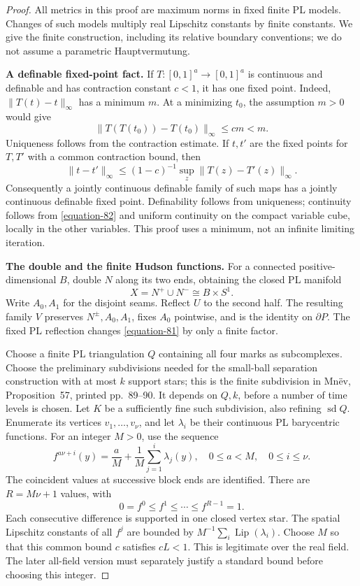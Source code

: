 \documentclass[11pt,a4paper]{article}
\theoremstyle{definition}
\begin{document}
\begin{proof}
All metrics in this proof are maximum norms in fixed finite PL models.
Changes of such models multiply real Lipschitz constants by finite
constants. We give the finite construction, including its relative
boundary conventions; we do not assume a parametric Hauptvermutung.

\textbf{A definable fixed-point fact.}\quad
If \(T:[0,1]^a\to[0,1]^a\) is continuous and definable and has
contraction constant \(c<1\), it has one fixed point. Indeed,
\(\|T(t)-t\|_\infty\) has a minimum \(m\). At a minimizing \(t_0\),
the assumption \(m>0\) would give
\[
 \|T(T(t_0))-T(t_0)\|_\infty\leq cm<m.
\]
Uniqueness follows from the contraction estimate. If \(t,t'\) are
the fixed points for \(T,T'\) with a common contraction bound, then
\begin{equation}
 \|t-t'\|_\infty\leq
 (1-c)^{-1}\sup_z\|T(z)-T'(z)\|_\infty.
 \label{equation-82}
\end{equation}
Consequently a jointly continuous definable family of such maps has
a jointly continuous definable fixed point. Definability follows from
uniqueness; continuity follows from \eqref{equation-82} and uniform continuity on
the compact variable cube, locally in the other variables. This proof
uses a minimum, not an infinite limiting iteration.

\textbf{The double and the finite Hudson functions.}\quad
For a connected positive-dimensional \(B\), double \(N\) along its two
ends, obtaining the closed PL manifold
\[
 X=N^+\cup N^-\cong B\times S^1.
\]
Write \(A_0,A_1\) for the disjoint seams. Reflect \(U\) to the second
half. The resulting family \(V\) preserves \(N^\pm,A_0,A_1\), fixes
\(A_0\) pointwise, and is the identity on \(\partial P\).
The fixed PL reflection changes \eqref{equation-81} by only a finite factor.

Choose a finite PL triangulation \(Q\) containing all four marks as
subcomplexes. Choose the preliminary subdivisions needed for the
small-ball separation construction with at most \(k\) support stars;
this is the finite subdivision in Mn\"ev, Proposition~57,
printed pp.~89--90. It depends on \(Q,k\), before a number of time
levels is chosen. Let \(K\) be a sufficiently fine such subdivision,
also refining \(\operatorname{sd}Q\).
Enumerate its vertices \(v_1,\ldots,v_\nu\), and let \(\lambda_i\)
be their continuous PL barycentric functions.
For an integer \(M>0\), use the sequence
\begin{equation}
 f^{a\nu+i}(y)=\frac aM+
        \frac1M\sum_{j=1}^{i}\lambda_j(y),
 \quad 0\leq a<M,\quad0\leq i\leq\nu .
 \label{equation-83}
\end{equation}
The coincident values at successive block ends are identified.
There are \(R=M\nu+1\) values, with
\[
 0=f^0\leq f^1\leq\cdots\leq f^{R-1}=1.
\]
Each consecutive difference is supported in one closed vertex star.
The spatial Lipschitz constants of all \(f^j\) are bounded by
\(M^{-1}\sum_i\operatorname{Lip}(\lambda_i)\).
Choose \(M\) so that this common bound \(c\) satisfies \(cL<1\).
This is legitimate over the real field. The later all-field version
must separately justify a standard bound before choosing this integer.


\end{proof}
\end{document}
